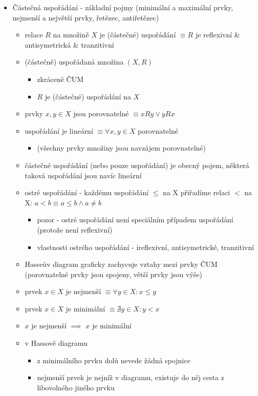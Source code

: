 \begin{itemize}
\begin{itemize}
\begin{enumerate}
\end{enumerate}
\end{itemize}
\item Částečná uspořádání - základní pojmy (minimální a maximální prvky, nejmenší a největší prvky, řetězec, antiřetězec)
\begin{itemize}
\item relace $R$ na množině $X$ je (částečné) uspořádání $\equiv R$ je reflexivní \& antisymetrická \& tranzitivní
\item (částečně) uspořádaná množina $(X,R)$
\begin{itemize}
\item zkráceně ČUM
\item $R$ je (částečné) uspořádání na $X$
\end{itemize}
\item prvky $x,y \in X$ jsou porovnatelné $\equiv xRy \lor yRx$
\item uspořádání je lineární $\equiv \forall x,y\in X$ porovnatelné
\begin{itemize}
\item (všechny prvky množiny jsou navzájem porovnatelné)
\end{itemize}
\item částečné uspořádání (nebo pouze uspořádání) je obecný pojem, některá taková uspořádání jsou navíc lineární
\item ostré uspořádání - každému uspořádání $\leq$ na X přiřadíme relaci $<$ na X: $a < b \equiv a \leq b \land a \neq b$ 
\begin{itemize}
\item pozor - ostré uspořádání není speciálním případem uspořádání (protože není reflexivní)
\item vlastnosti ostrého uspořádání - ireflexivní, antisymetrické, tranzitivní
\end{itemize}
\item Hasseův diagram graficky zachycuje vztahy mezi prvky ČUM (porovnatelné prvky jsou spojeny, větší prvky jsou výše)
\item prvek $x\in X$ je nejmenší $\equiv \forall y \in X: x\leq y$
\item prvek $x\in X$ je minimální $\equiv \nexists y \in X: y\lt x$
\item $x$ je nejmenší $\implies$ $x$ je minimální
\item v Hassově diagramu
\begin{itemize}
\item z minimálního prvku dolů nevede žádná spojnice
\item nejmenší prvek je nejníž v diagramu, existuje do něj cesta z libovolného jiného prvku

\end{itemize}
\end{itemize}
\end{itemize}
